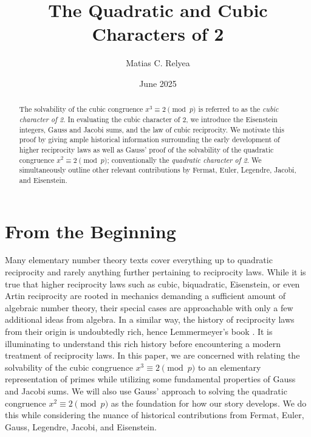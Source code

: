 \documentclass[10pt]{amsart}
\title{The Quadratic and Cubic Characters of 2}
\date{June 2025}
\author{Matias C. Relyea}
\theoremstyle{plain}
\theoremstyle{definition}
\theoremstyle{remark}
\numberwithin{equation}{section}
\begin{document}
\maketitle

\begin{abstract}
      The solvability of the cubic congruence $x^{3}\equiv 2\pmod{p}$ is referred to as the \textit{cubic character of 2}. In evaluating the cubic character of 2, we introduce the Eisenstein integers, Gauss and Jacobi sums, and the law of cubic reciprocity. We motivate this proof by giving ample historical information surrounding the early development of higher reciprocity laws as well as Gauss' proof of the solvability of the quadratic congruence $x^{2}\equiv 2\pmod{p}$; conventionally the \textit{quadratic character of 2}. We simultaneously outline other relevant contributions by Fermat, Euler, Legendre, Jacobi, and Eisenstein. 
\end{abstract}

\section*{From the Beginning}
Many elementary number theory texts cover everything up to quadratic reciprocity and rarely anything further pertaining to reciprocity laws. While it is true that higher reciprocity laws such as cubic, biquadratic, Eisenstein, or even Artin reciprocity are rooted in mechanics demanding a sufficient amount of algebraic number theory, their special cases are approachable with only a few additional ideas from algebra. In a similar way, the history of reciprocity laws from their origin is undoubtedly rich, hence Lemmermeyer’s book \cite{lemmermeyer2000reciprocity}. It is illuminating to understand this rich history before encountering a modern treatment of reciprocity laws. In this paper, we are concerned with relating the solvability of the cubic congruence $x^{3}\equiv 2\pmod{p}$ to an elementary representation of primes while utilizing some fundamental properties of Gauss and Jacobi sums. We will also use Gauss’ approach to solving the quadratic congruence $x^{2}\equiv 2\pmod{p}$ as the foundation for how our story develops. We do this while considering the nuance of historical contributions from Fermat, Euler, Gauss, Legendre, Jacobi, and Eisenstein. 
\end{document}
